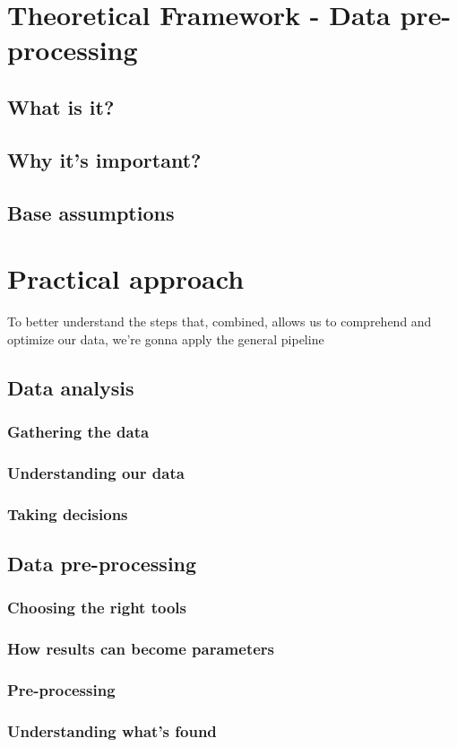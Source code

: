\documentclass[a4paper,11pt]{article}
\begin{document}
\section{Theoretical Framework - Data pre-processing}
\subsection{What is it?}
\subsection{Why it's important?}
\subsection{Base assumptions}
\section{Practical approach}
To better understand the steps that, combined, allows us to comprehend and
optimize our data, we're gonna apply the general pipeline
\subsection{Data analysis}
\subsubsection{Gathering the data}
\subsubsection{Understanding our data}
\subsubsection{Taking decisions}
\subsection{Data pre-processing}
\subsubsection{Choosing the right tools}
\subsubsection{How results can become parameters}
\subsubsection{Pre-processing}
\subsubsection{Understanding what's found}


\newpage
\printbibliography
\end{document}
